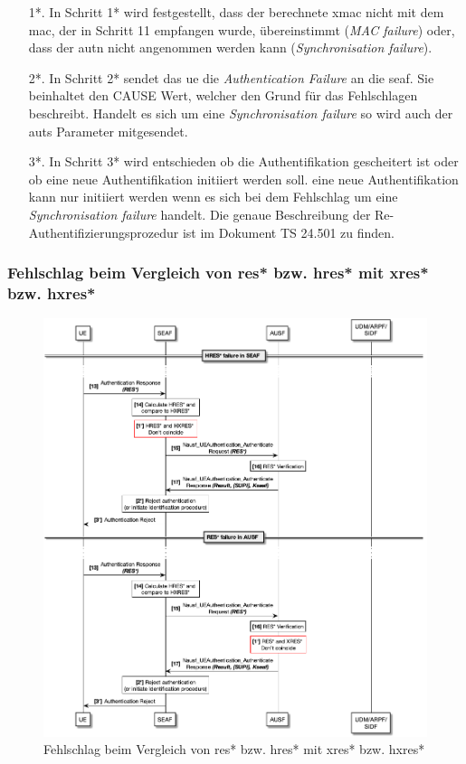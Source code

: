 \begin{enumerate}
\item[1*.] In Schritt 1* wird festgestellt, dass der berechnete \gls{xmac} nicht mit dem \gls{mac}, der in Schritt 11 empfangen wurde, übereinstimmt (\textit{MAC failure}) oder, dass der \gls{autn} nicht angenommen werden kann (\textit{Synchronisation failure}).

\item[2*.] In Schritt 2* sendet das \gls{ue} die \textit{Authentication Failure} an die \gls{seaf}.
Sie beinhaltet den CAUSE Wert, welcher den Grund für das Fehlschlagen beschreibt.
Handelt es sich um eine \textit{Synchronisation failure} so wird auch der \gls{auts} Parameter mitgesendet.

\item[3*.] In Schritt 3* wird entschieden ob die Authentifikation gescheitert ist oder ob eine neue Authentifikation initiiert werden soll.
eine neue Authentifikation kann nur initiiert werden wenn es sich bei dem Fehlschlag um eine \textit{Synchronisation failure} handelt.
Die genaue Beschreibung der Re-Authentifizierungsprozedur ist im Dokument TS 24.501 zu finden. %
\end{enumerate}


\subsubsection{Fehlschlag beim Vergleich von \gls{res*} bzw. \gls{hres*} mit \gls{xres*} bzw. \gls{hxres*}}

\begin{figure}[H]
  \centering
  \includegraphics[width=\textwidth]{uml/protocol_res*_verification_failure_v1.png}
  \caption{Fehlschlag beim Vergleich von \gls{res*} bzw. \gls{hres*} mit \gls{xres*} bzw. \gls{hxres*}}
  \label{fig:protocol_res*_verification_failure_v1}
\end{figure}

